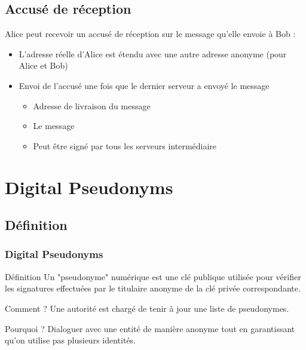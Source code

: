 \documentclass{beamer}
\begin{document}
\subsection{Accusé de réception}
\begin{frame}
Alice peut recevoir un accusé de réception sur le message qu'elle envoie à Bob :
\begin{itemize}
[triangle]
\item L'adresse réelle d'Alice est étendu avec une autre adresse anonyme (pour Alice et Bob)
\pause
\item Envoi de l'accusé une fois que le dernier serveur a envoyé le message
\pause
	\begin{itemize}
	\item Adresse de livraison du message
	\item Le message
	\item Peut être signé par tous les serveurs intermédiaire
	\end{itemize}
\end{itemize}
\end{frame}

\section{Digital Pseudonyms}
\subsection{Définition}
\begin{frame}
\frametitle{Digital Pseudonyms}
\begin{block}{Définition}
Un "pseudonyme" numérique est une clé publique utilisée pour vérifier les signatures effectuées par le titulaire anonyme de la clé privée correspondante.
\end{block}
\pause
\begin{block}{Comment ?}
Une autorité est chargé de tenir à jour une liste de pseudonymes.
\end{block}
\pause
\begin{block}{Pourquoi ?}
Dialoguer avec une entité de manière anonyme tout en garantissant qu'on utilise pas plusieurs identités.
\end{block}
\end{frame}
\end{document}
